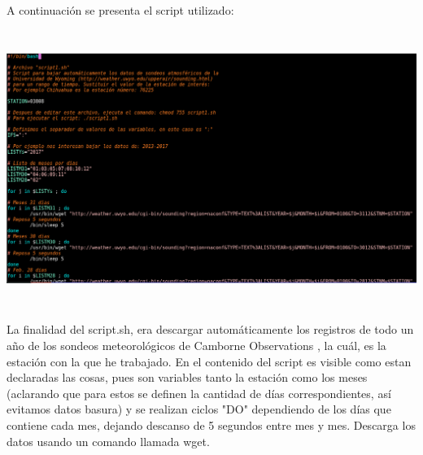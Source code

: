 \documentclass[12pt]{article}
\begin{document}
A continuación se presenta el script utilizado:
\begin{center}
	\includegraphics[height=9cm]{scriptdescarga.png}
\end{center}

La finalidad del script.sh, era descargar automáticamente los registros de todo un año de los sondeos meteorológicos de Camborne Observations , la cuál, es la estación con la que he trabajado. En el contenido del script es visible como estan declaradas las cosas, pues son variables tanto la estación como los meses (aclarando que para estos se definen la cantidad de días correspondientes, así evitamos datos basura) y se realizan ciclos "DO" dependiendo de los días que contiene cada mes, dejando descanso de 5 segundos entre mes y mes. Descarga los datos usando un comando llamada wget.\\
\end{document}

